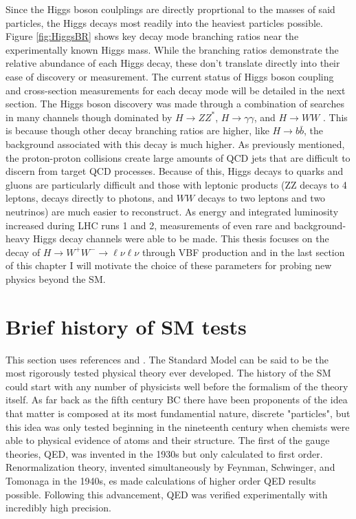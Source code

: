 Since the Higgs boson coulplings are directly proprtional to the masses of said particles, the Higgs decays most readily into the heaviest particles possible. Figure \ref{fig:HiggsBR} shows key decay mode branching ratios near the experimentally known Higgs mass. While the branching ratios demonstrate the relative abundance of each Higgs decay, these don't translate directly into their ease of discovery or measurement. The current status of Higgs boson coupling and cross-section measurements for each decay mode will be detailed in the next section. The Higgs boson discovery was made through a combination of searches in many channels though dominated by $H\rightarrow ZZ^*$, $H\rightarrow\gamma\gamma$, and $H\rightarrow WW$ \cite{Higgsdiscovery}. This is because though other decay branching ratios are higher, like $H\rightarrow b\bar{b}$, the background associated with this decay is much higher. As previously mentioned, the proton-proton collisions create large amounts of QCD jets that are difficult to discern from target QCD processes. Because of this, Higgs decays to quarks and gluons are particularly difficult and those with leptonic products (ZZ decays to 4 leptons, decays directly to photons, and $WW$ decays to two leptons and two neutrinos) are much easier to reconstruct. As energy and integrated luminosity increased during LHC runs 1 and 2, measurements of even rare and background-heavy Higgs decay channels were able to be made.  This thesis focuses on the decay of $H\rightarrow W^+W^-\rightarrow \ell\nu\ell\nu$ through VBF production and in the last section of this chapter I will motivate the choice of these parameters for probing new physics beyond the SM.   

\section{Brief history of SM tests}
This section uses references \cite{Kibble} and \cite{HistoryBook}.
The Standard Model can be said to be the most rigorously tested physical theory ever developed. The history of the SM could start with any number of physicists well before the formalism of the theory itself. As far back as the fifth century BC there have been proponents of the idea that matter is composed at its most fundamential nature, discrete "particles", but this idea was only tested beginning in the nineteenth century when chemists were able to physical evidence of atoms and their structure. The first of the gauge theories, QED, was invented in the 1930s but only calculated to first order. Renormalization theory, invented simultaneously by Feynman, Schwinger, and Tomonaga in the 1940s, 
es made calculations of higher order QED results possible. Following this advancement, QED was verified experimentally with incredibly high precision. 

